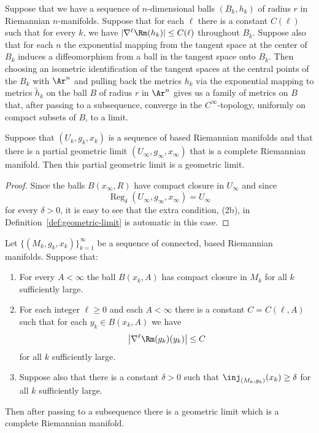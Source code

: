 \begin{lemma}\label{lem:gaussian-coordinates-convergence}
Suppose that we have a sequence of $n$-dimensional balls $(B_k,h_k)$
of radius $r$ in Riemannian $n$-manifolds. Suppose that for each
$\ell$ there is a constant $C(\ell)$ such that for every $k$, we
have $|\nabla ^\ell \Rm(h_k)|\le C(\ell)$ throughout $B_k$.
Suppose also that for each $n$ the exponential mapping from the
tangent space at the center of $B_k$ induces a diffeomorphism from a
ball in the tangent space onto $B_k$. Then choosing an isometric
identification of the tangent spaces at the central points of the
$B_k$ with $\Ar^n$ and pulling back the metrics $h_k$ via the
exponential mapping to metrics $\tilde h_k$ on the ball $B$ of
radius $r$ in $\Ar^n$ gives us a family of metrics on $B$ that,
after passing to a subsequence, converge in the $C^\infty$-topology,
uniformly on compact subsets of $B$, to a limit.
\end{lemma}

\begin{lemma}\label{lem:partial-limit-complete-is-limit}

Suppose that $(U_k,g_k,x_k)$ is a sequence of based Riemannian
manifolds and that there is a partial geometric limit
$(U_\infty,g_\infty,x_\infty)$ that is a complete Riemannian
manifold. Then this partial geometric limit is a geometric limit.
\end{lemma}




\begin{proof}
\sketch
{}
Since the balls $B(x_\infty,R)$ have compact closure in $U_\infty$
and since
$$\operatorname{Reg}_\delta(U_\infty,g_\infty,x_\infty)=U_\infty$$ for
every $\delta>0$, it is easy to see that the extra condition, (2b), in
Definition~\ref{def:geometric-limit} is automatic in this case.
\end{proof}

\begin{theorem}\label{thm:manifold-convergence-complete-limit}
\label{mfdconv}

Let $\{(M_k,g_k,x_k)\}_{k=1}^\infty$ be a sequence  of connected,
based Riemannian manifolds. Suppose that:
\begin{enumerate}
\item[(1)] For every $A<\infty$ the ball
$B(x_k,A)$ has compact closure in $M_k$ for all $k$ sufficiently
large.
\item[(2)] For each integer $\ell\ge 0$ and each $A<\infty$ there is a constant
$C=C(\ell,A)$ such that for each $y_k\in B(x_k,A)$ we have
$$\left|\nabla^\ell\Rm(g_k)(y_k)\right|\le C$$
for all $k$ sufficiently large.
\item[(3)] Suppose also that there is a constant $\delta>0$ such that $\inj_{(M_k,g_k)}(x_k)\ge \delta$ for all $k$ sufficiently large.
\end{enumerate}
 Then after passing to a subsequence there is a geometric limit which
 is a complete Riemannian manifold.
\end{theorem}

